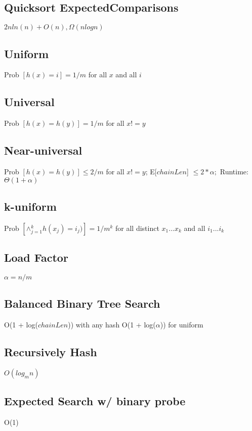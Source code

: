 \begin{algorithmic}[1]
		\EndFor
		\Else
		\EndIf
	\EndFunction
\end{algorithmic}


\subsection{Quicksort ExpectedComparisons}
$2nln(n) + O(n), \Omega(nlogn)$


\subsection{Uniform}

Prob $[h(x) = i] = 1/m$ for all $x$ and all $i$

\subsection{Universal}
Prob $[h(x) = h(y)] = 1/m$ for all $x != y$
\subsection{Near-universal}
Prob $[h(x) = h(y)] \leq 2/m$ for all $x != y$; E[$chainLen$] $\leq 2*\alpha;$ Runtime: $\Theta(1 + \alpha)$
\subsection{k-uniform}
Prob $ [ \wedge{}_{j=1}^{k} h(x_j) = i_j) ] = 1 / m^{k}$ for all distinct $x_1...x_k$ and all $i_1...i_k$
\subsection{Load Factor}
$\alpha = n/m$
\subsection{Balanced Binary Tree Search}
O(1 + log($chainLen$)) with any hash 
O(1 + log($\alpha$)) for uniform
\subsection{Recursively Hash}
$O(log_{m}{n})$
\subsection{Expected Search w/ binary probe}
O(1)